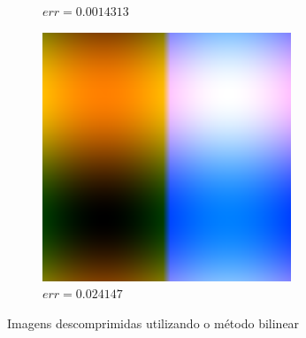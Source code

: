 \documentclass[12pt, a4paper]{article}
\begin{document}
\begin{figure}[h]
\begin{subfigure}{.3\textwidth}
            \caption{$err = 0.0014313$}
        \end{subfigure}
        \begin{subfigure}{.3\textwidth}
            \includegraphics[width=.95\textwidth]{../trdFunBL.png}
            \caption{$err = 0.024147$}
        \end{subfigure}
        \caption{Imagens descomprimidas utilizando o método bilinear}
    \end{figure}
\end{document}
